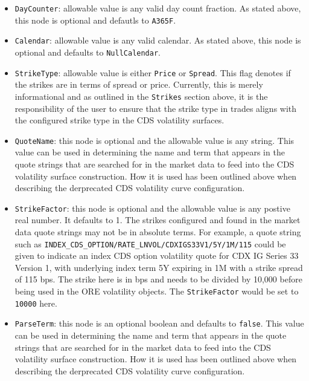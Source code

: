 \documentclass[12pt, a4paper]{article}
\begin{document}
{{\begin{itemize}
\item
\lstinline!DayCounter!: allowable value is any valid day count fraction. As stated above, this node is optional and defautls to \lstinline!A365F!.

\item
\lstinline!Calendar!: allowable value is any valid calendar. As stated above, this node is optional and defaults to \lstinline!NullCalendar!.

\item
\lstinline!StrikeType!: allowable value is either \lstinline!Price! or \lstinline!Spread!. This flag denotes if the strikes are in terms of spread or price. Currently, this is merely informational and as outlined in the \lstinline!Strikes! section above, it is the responsibility of the user to ensure that the strike type in trades aligns with the configured strike type in the CDS volatility surfaces.

\item
\lstinline!QuoteName!: this node is optional and the allowable value is any string. This value can be used in determining the name and term that appears in the quote strings that are searched for in the market data to feed into the CDS volatility surface construction. How it is used has been outlined above when describing the derprecated CDS volatility curve configuration.

\item
\lstinline!StrikeFactor!: this node is optional and the allowable value is any postive real number. It defaults to 1. The strikes configured and found in the market data quote strings may not be in absolute terms. For example, a quote string such as \lstinline!INDEX_CDS_OPTION/RATE_LNVOL/CDXIGS33V1/5Y/1M/115! could be given to indicate an index CDS option volatility quote for CDX IG Series 33 Version 1, with underlying index term 5Y expiring in 1M with a strike spread of 115 bps. The strike here is in bps and needs to be divided by 10,000 before being used in the ORE volatility objects. The \lstinline!StrikeFactor! would be set to \lstinline!10000! here.

\item
\lstinline!ParseTerm!: this node is an optional boolean and defaults to \lstinline!false!. This value can be used in determining the name and term that appears in the quote strings that are searched for in the market data to feed into the CDS volatility surface construction. How it is used has been outlined above when describing the derprecated CDS volatility curve configuration.


\end{itemize}}}
\end{document}
